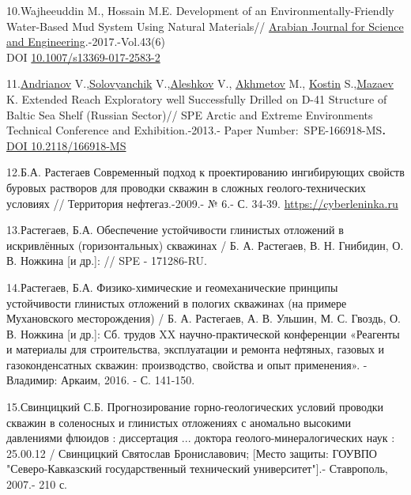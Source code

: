 \begin{references}
10.Wajheeuddin M., Hossain M.E. Development of an
Environmentally-Friendly Water-Based Mud System Using Natural
Materials//
\href{https://www.researchgate.net/journal/Arabian-Journal-for-Science-and-Engineering-2191-4281?_tp=eyJjb250ZXh0Ijp7ImZpcnN0UGFnZSI6InB1YmxpY2F0aW9uIiwicGFnZSI6InB1YmxpY2F0aW9uIn19}{Arabian
Journal for Science and Engineering}.-2017.-Vol.43(6) \\DOI
\href{https://doi.org/10.1007/s13369-017-2583-2}{10.1007/s13369-017-2583-2}

11.\href{javascript:;}{Andrianov} V.,\href{javascript:;}{Solovyanchik}
V.,\href{javascript:;}{Aleshkov} V., \href{javascript:;}{Akhmetov} M.,
\href{javascript:;}{Kostin} S.,\href{javascript:;}{Mazaev} K. Extended
Reach Exploratory well Successfully Drilled on D-41 Structure of Baltic
Sea Shelf (Russian Sector)// SPE Arctic and Extreme Environments
Technical Conference and Exhibition.-2013.- Paper
Number:~SPE-166918-MS{\bfseries .}
\href{https://doi.org/10.2118/166918-MS}{DOI 10.2118/166918-MS}

12.Б.А. Растегаев Современный подход к проектированию ингибирующих
свойств буровых растворов для проводки скважин в сложных
геолого-технических условиях // Территория нефтегаз.-2009.- № 6.- С.
34-39.
\href{https://cyberleninka.ru/article/n/sovremennyy-podhod-k-proektirovaniyu-ingibiruyuschih-svoystv-burovyh-rastvorov-dlya-provodki-skvazhin-v-slozhnyh-geologo-tehnicheskih}{https://cyberleninka.ru}

13.Растегаев, Б.А. Обеспечение устойчивости глинистых отложений в
искривлённых (горизонтальных) скважинах / Б. А. Растегаев, В. Н.
Гнибидин, О. В. Ножкина {[}и др.{]}: // SPE - 171286-RU.

14.Растегаев, Б.А. Физико-химические и геомеханические принципы
устойчивости глинистых отложений в пологих скважинах (на примере
Мухановского месторождения) / Б. А. Растегаев, А. В. Ульшин, М. С.
Гвоздь, О. В. Ножкина {[}и др.{]}: Сб. трудов XX научно-практической
конференции «Реагенты и материалы для строительства, эксплуатации и
ремонта нефтяных, газовых и газоконденсатных скважин: производство,
свойства и опыт применения». - Владимир: Аркаим, 2016. - С. 141-150.

15.Свинцицкий С.Б. Прогнозирование горно-геологических условий проводки
скважин в соленосных и глинистых отложениях с аномально высокими
давлениями флюидов : диссертация ... доктора геолого-минералогических
наук : 25.00.12 / Свинцицкий Святослав Брониславович; {[}Место защиты:
ГОУВПО "Северо-Кавказский государственный технический университет"{]}.-
Ставрополь, 2007.- 210 с.


\end{references}
